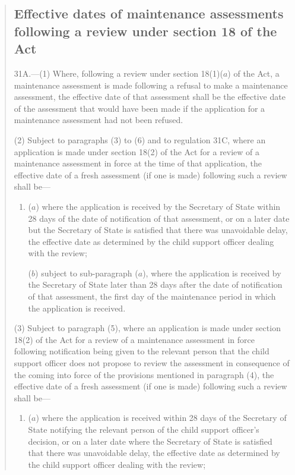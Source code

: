 \documentclass[a4paper]{article}
\begin{document}
\begin{quotation}
\subsection*{Effective dates of maintenance assessments following a review under section 18 of the Act}

31A.—(1) Where, following a review under section 18(1)($a$) of the Act, a maintenance assessment is made following a refusal to make a maintenance assessment, the effective date of that assessment shall be the effective date of the assessment that would have been made if the application for a maintenance assessment had not been refused.

(2) Subject to paragraphs (3) to (6) and to regulation 31C, where an application is made under section 18(2) of the Act for a review of a maintenance assessment in force at the time of that application, the effective date of a fresh assessment (if one is made) following such a review shall be—
\begin{enumerate}\item[]
($a$) where the application is received by the Secretary of State within 28 days of the date of notification of that assessment, or on a later date but the Secretary of State is satisfied that there was unavoidable delay, the effective date as determined by the child support officer dealing with the review;

($b$) subject to sub-paragraph ($a$), where the application is received by the Secretary of State later than 28 days after the date of notification of that assessment, the first day of the maintenance period in which the application is received.
\end{enumerate}

(3) Subject to paragraph (5), where an application is made under section 18(2) of the Act for a review of a maintenance assessment in force following notification being given to the relevant person that the child support officer does not propose to review the assessment in consequence of the coming into force of the provisions mentioned in paragraph (4), the effective date of a fresh assessment (if one is made) following such a review shall be—
\begin{enumerate}\item[]
($a$) where the application is received within 28 days of the Secretary of State notifying the relevant person of the child support officer’s decision, or on a later date where the Secretary of State is satisfied that there was unavoidable delay, the effective date as determined by the child support officer dealing with the review;


\end{enumerate}
\end{quotation}
\end{document}
